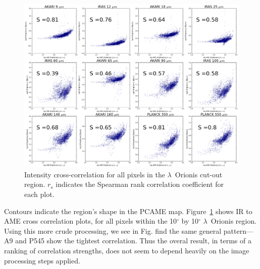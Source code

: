           \begin{figure}
            \includegraphics[width=\textwidth]{../Plots/orionis_correlations_AME.png}
            \centering
            \caption{Intensity cross-correlation for all pixels in the $\lambda$~Orionis cut-out region.  $r_{s}$ indicates the Spearman rank correlation coefficient for each plot.}
            \label{fig:orionis-corr}
          \end{figure}
        Contours indicate the region's shape in the PCAME map. Figure~\ref{fig:orionis-corr} shows IR to AME cross correlation plots, for all pixels within the 10$^{\circ}$ by 10$^{\circ}$ $\lambda$~Orionis region. Using this more crude processing, we see in Fig. find the same general pattern--- A9 and P545 show the tightest correlation. Thus the overal result, in terms of a ranking of correlation strengths, does not seem to depend heavily on the image processing steps applied.

